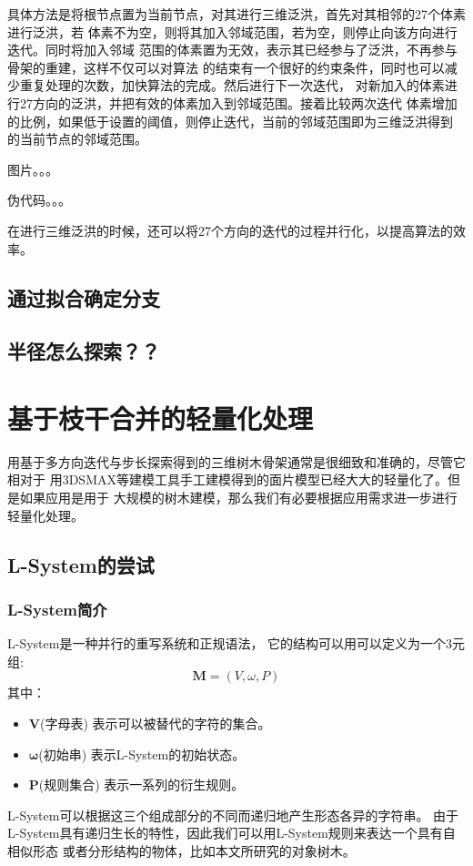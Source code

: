 具体方法是将根节点置为当前节点，对其进行三维泛洪，首先对其相邻的27个体素进行泛洪，若
体素不为空，则将其加入邻域范围，若为空，则停止向该方向进行迭代。同时将加入邻域
范围的体素置为无效，表示其已经参与了泛洪，不再参与骨架的重建，这样不仅可以对算法
的结束有一个很好的约束条件，同时也可以减少重复处理的次数，加快算法的完成。然后进行下一次迭代，
对新加入的体素进行27方向的泛洪，并把有效的体素加入到邻域范围。接着比较两次迭代
体素增加的比例，如果低于设置的阈值，则停止迭代，当前的邻域范围即为三维泛洪得到
的当前节点的邻域范围。

图片。。。

伪代码。。。

在进行三维泛洪的时候，还可以将27个方向的迭代的过程并行化，以提高算法的效率。

\subsection{通过拟合确定分支}

\subsection{半径怎么探索？？}

\section{基于枝干合并的轻量化处理}
\label{sec:branchcombine}
用基于多方向迭代与步长探索得到的三维树木骨架通常是很细致和准确的，尽管它相对于
用3DSMAX等建模工具手工建模得到的面片模型已经大大的轻量化了。但是如果应用是用于
大规模的树木建模，那么我们有必要根据应用需求进一步进行轻量化处理。

\subsection{L-System的尝试}
\label{subsec:lsystem}

\subsubsection{L-System简介}
L-System是一种并行的重写系统和正规语法，
它的结构可以用可以定义为一个3元组:\\
\[\mathbf{M} = (V, \omega, P)\]
其中：\\
\begin{itemize}
	\item $\mathbf{V}$(字母表) 表示可以被替代的字符的集合。
	\item $\mathbf{\omega}$(初始串) 表示L-System的初始状态。
	\item $\mathbf{P}$(规则集合) 表示一系列的衍生规则。
\end{itemize}
L-System可以根据这三个组成部分的不同而递归地产生形态各异的字符串。
由于L-System具有递归生长的特性，因此我们可以用L-System规则来表达一个具有自相似形态
或者分形结构的物体，比如本文所研究的对象\raisebox{0.5mm}{------}树木。

